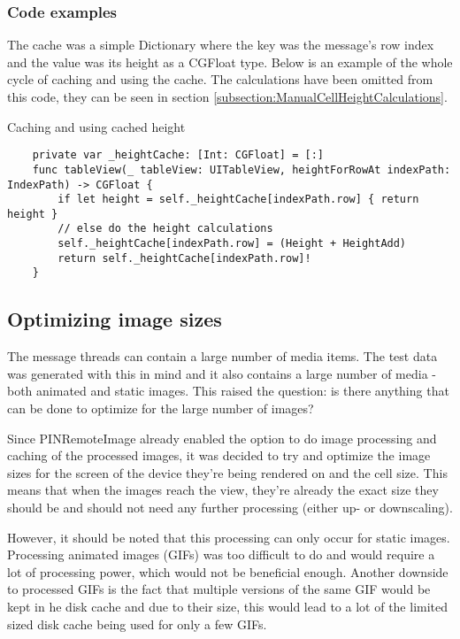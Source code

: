 \documentclass[a4paper,12pt]{article}
\begin{document}
\subsubsection*{Code examples}
The cache was a simple Dictionary where the key was the message's row index and the value was its height as a CGFloat type. Below is an example of the whole cycle of caching and using the cache. The calculations have been omitted from this code, they can be seen in section \ref{subsection:ManualCellHeightCalculations}. 
\begin{listing}[H]
  \caption{Caching and using cached height}
  \begin{verbatim}
    private var _heightCache: [Int: CGFloat] = [:]
    func tableView(_ tableView: UITableView, heightForRowAt indexPath: IndexPath) -> CGFloat {
        if let height = self._heightCache[indexPath.row] { return height }
        // else do the height calculations
        self._heightCache[indexPath.row] = (Height + HeightAdd)
        return self._heightCache[indexPath.row]!
    }
  \end{verbatim}
\end{listing}


\subsection{Optimizing image sizes}
The message threads can contain a large number of media items. The test data was generated with this in mind and it also contains a large number of media - both animated and static images. This raised the question: is there anything that can be done to optimize for the large number of images?

Since PINRemoteImage already enabled the option to do image processing and caching of the processed images, it was decided to try and optimize the image sizes for the screen of the device they're being rendered on and the cell size. This means that when the images reach the view, they're already the exact size they should be and should not need any further processing (either up- or downscaling).

However, it should be noted that this processing can only occur for static images. Processing animated images (GIFs) was too difficult to do and would require a lot of processing power, which would not be beneficial enough. Another downside to processed GIFs is the fact that multiple versions of the same GIF would be kept in he disk cache and due to their size, this would lead to a lot of the limited sized disk cache being used for only a few GIFs.
\end{document}
